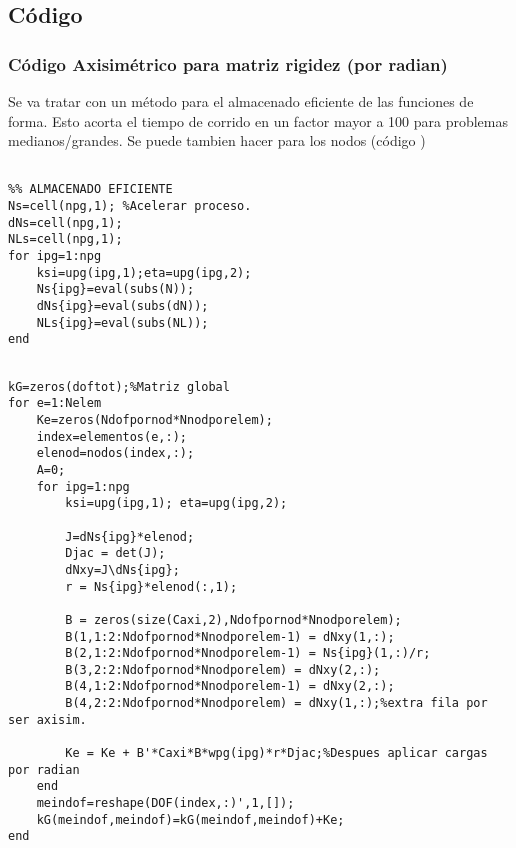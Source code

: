  \subsection*{Código \Matlab{}}
    \subsubsection*{Código Axisimétrico para matriz rigidez (por radian)}
    Se va tratar con un método para el almacenado eficiente de las funciones de forma. Esto acorta el tiempo de corrido en un factor mayor a 100 para problemas medianos/grandes. Se puede tambien hacer para los nodos (código )
    \begin{code}
    \begin{verbatim}

%% ALMACENADO EFICIENTE
Ns=cell(npg,1); %Acelerar proceso.
dNs=cell(npg,1);
NLs=cell(npg,1);
for ipg=1:npg
    ksi=upg(ipg,1);eta=upg(ipg,2);
    Ns{ipg}=eval(subs(N));
    dNs{ipg}=eval(subs(dN));
    NLs{ipg}=eval(subs(NL));
end
    \end{verbatim}
    \end{code}
    
    \begin{code}
    \begin{verbatim}
    
kG=zeros(doftot);%Matriz global
for e=1:Nelem
    Ke=zeros(Ndofpornod*Nnodporelem);
    index=elementos(e,:);
    elenod=nodos(index,:);
    A=0;
    for ipg=1:npg
        ksi=upg(ipg,1); eta=upg(ipg,2);

        J=dNs{ipg}*elenod;
        Djac = det(J);
        dNxy=J\dNs{ipg};
        r = Ns{ipg}*elenod(:,1); 
        
        B = zeros(size(Caxi,2),Ndofpornod*Nnodporelem);
        B(1,1:2:Ndofpornod*Nnodporelem-1) = dNxy(1,:);
        B(2,1:2:Ndofpornod*Nnodporelem-1) = Ns{ipg}(1,:)/r;
        B(3,2:2:Ndofpornod*Nnodporelem) = dNxy(2,:);
        B(4,1:2:Ndofpornod*Nnodporelem-1) = dNxy(2,:);
        B(4,2:2:Ndofpornod*Nnodporelem) = dNxy(1,:);%extra fila por ser axisim.

        Ke = Ke + B'*Caxi*B*wpg(ipg)*r*Djac;%Despues aplicar cargas por radian
    end
    meindof=reshape(DOF(index,:)',1,[]);
    kG(meindof,meindof)=kG(meindof,meindof)+Ke;
end
\end{verbatim}
\end{code}

